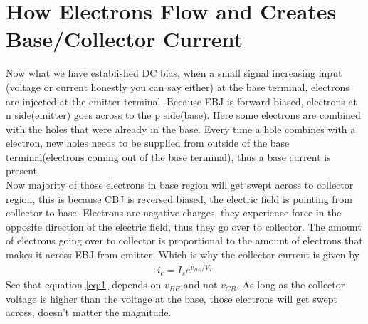 \documentclass{article}
\begin{document}
	\section{How Electrons Flow and Creates Base/Collector Current}
		Now what we have established DC bias, when a small signal increasing input (voltage or current honestly you can say either) at the base terminal, electrons are injected at the emitter terminal. Because EBJ is forward biased, electrons at n side(emitter) goes across to the p side(base). Here some electrons are combined with the holes that were already in the base. Every time a hole combines with a electron, new holes needs to be supplied from outside of the base terminal(electrons coming out of the base terminal), thus a base current is present.\\
		Now majority of those electrons in base region will get swept across to collector region, this is because CBJ is reversed biased, the electric field is pointing from collector to base. Electrons are negative charges, they experience force in the opposite direction of the electric field, thus they go over to collector. The amount of electrons going over to collector is proportional to the amount of electrons that makes it across EBJ from emitter. Which is why the collector current is given by
		\begin{align}
			\label{eq:1}
			i_c=I_{s}e^{v_{BE}/V_{T}}
		\end{align}
		See that equation \ref{eq:1} depends on $v_{BE}$ and not $v_{CB}$. As long as the collector voltage is higher than the voltage at the base, those electrons will get swept across, doesn't matter the magnitude.
\end{document}
